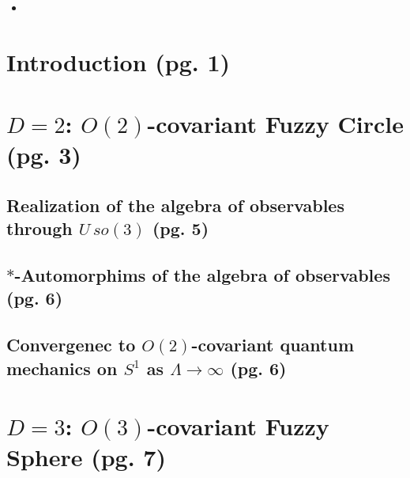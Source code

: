 \documentclass{article}
\begin{document}
    \begin{itemize}

    \item 
    
    \end{itemize}

\section{Introduction (pg. 1)}


\section{$D = 2$: $O(2)$-covariant Fuzzy Circle (pg. 3)}

\subsection{Realization of the algebra of observables through $U\,so(3)$ (pg. 5)}

\subsection{$*$-Automorphims of the algebra of observables (pg. 6)}


\subsection{Convergenec to $O(2)$-covariant quantum mechanics on $S^1$ as $\Lambda \to \infty$ (pg. 6)}

\section{$D = 3$: $O(3)$-covariant Fuzzy Sphere (pg. 7)}
\end{document}
